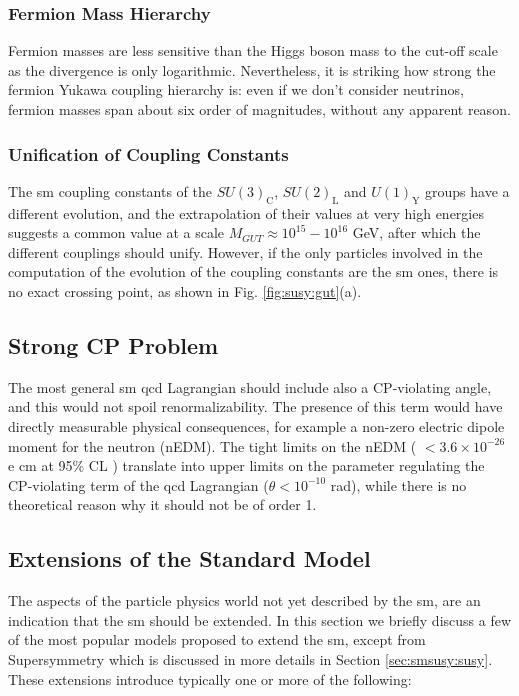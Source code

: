 \subsubsection*{Fermion Mass Hierarchy} 

Fermion masses are less sensitive than the Higgs boson mass to the cut-off scale as the divergence is only logarithmic. Nevertheless, it is striking how strong the fermion Yukawa coupling hierarchy is: even if we don't consider neutrinos, fermion masses span about six order of magnitudes, without any apparent reason.

\subsubsection*{Unification of Coupling Constants}

The \gls{sm} coupling constants of the $SU(3)_\mathrm{C}$, $SU(2)_\mathrm{L}$ and $U(1)_\mathrm{Y}$ groups have a different evolution, and the extrapolation of their values at very high energies suggests a common value at a scale $M_{GUT} \approx 10^{15}-10^{16}$ GeV, after which the different couplings should unify. However, if the only particles involved in the computation of the evolution of the coupling constants are the \gls{sm} ones, there is no exact crossing point, as shown in Fig. \ref{fig:susy:gut}(a).

\subsection*{Strong CP Problem}

The most general \gls{sm} \gls{qcd} Lagrangian should include also a CP-violating angle, and this would not spoil renormalizability. The presence of this term would have directly measurable physical consequences, for example a non-zero electric dipole moment for the neutron (nEDM). The tight  limits on the nEDM ( $< 3.6 \times 10^{-26}$ e cm at 95\% CL \cite{PhysRevD.92.092003}) translate into upper limits on the parameter regulating the CP-violating term of the \gls{qcd} Lagrangian ($\theta < 10^{-10}$ rad), while there is no theoretical reason why it should not be of order 1. 


\subsection{Extensions of the Standard Model}
\label{sec:sm:extensions}

The aspects of the particle physics world not yet described by the \gls{sm}, are an indication that the \gls{sm} should be extended.
In this section we briefly discuss a few of the most popular models proposed to extend the \gls{sm}, except from Supersymmetry which is discussed in more details in Section \ref{sec:smsusy:susy}. These extensions introduce typically one or more of the following:

